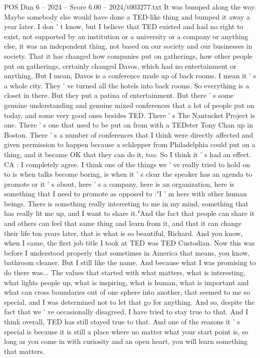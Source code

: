 \begin{textsample}{POS Dim 6 – 2024 – Score 6.00 – 2024/t003277.txt}
It was bumped along the way.
Maybe somebody else would have done a TED-like thing and bumped it away a year later.
I don ' t know, but I believe that TED existed and had no right to exist, not supported by an institution or a university or a company or anything else, it was an independent thing, not based on our society and our businesses in society.
That it has changed how companies put on gatherings, how other people put on gatherings, certainly changed Davos, which had no entertainment or anything.
But I mean, Davos is a conference made up of back rooms.
I mean it ' s a whole city.
They ' ve turned all the hotels into back rooms.
So everything is a closet in there.
But they put a patina of entertainment.
But there ' s some genuine understanding and genuine mixed conferences that a lot of people put on today, and some very good ones besides TED.
There ' s The Nantucket Project is one.
There ' s one that used to be put on from with a TEDster Tony Chan up in Boston.
There ' s a number of conferences that I think were directly affected and given permission to happen because a schlepper from Philadelphia could put on a thing, and it became OK that they can do it, too.
So I think it ' s had an effect.
CA : I completely agree.
I think one of the things we ' ve really tried to hold on to is when talks become boring, is when it ' s clear the speaker has an agenda to promote or it ' s about, here ' s a company, here is an organization, here is something that I need to promote as opposed to :"I ' m here with other human beings.
There is something really interesting to me in my mind, something that has really lit me up, and I want to share it."And the fact that people can share it and others can feel that same thing and learn from it, and that it can change their life ten years later, that is what is so beautiful, Richard.
And you know, when I came, the first job title I took at TED was TED Custodian.
Now this was before I understood properly that sometimes in America that means, you know, bathroom cleaner.
But I still like the name.
And because what I was promising to do there was...
The values that started with what matters, what is interesting, what lights people up, what is inspiring, what is human, what is important and what can cross boundaries out of one sphere into another, that seemed to me so special, and I was determined not to let that go for anything.
And so, despite the fact that we ' ve occasionally disagreed, I have tried to stay true to that.
And I think overall, TED has still stayed true to that.
And one of the reasons it ' s special is because it is still a place where no matter what your start point is, so long as you come in with curiosity and an open heart, you will learn something that matters.

\end{textsample}
